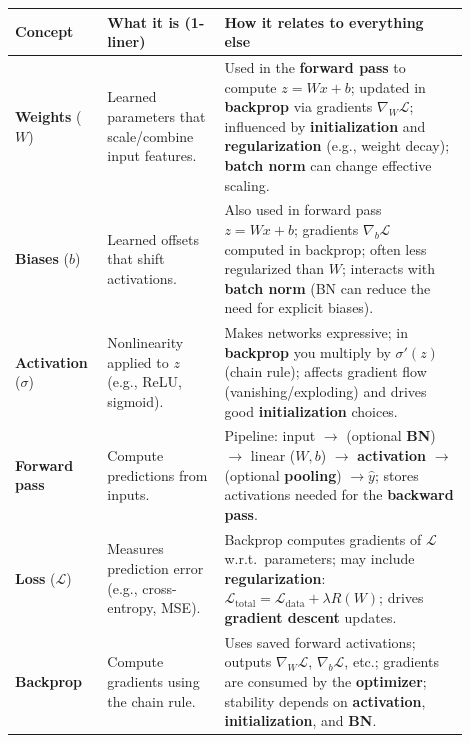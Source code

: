 \documentclass[11pt]{article}
\newcommand{\blue}[1]{\textcolor{myblue}{#1}}
\newcommand{\red}[1]{\textcolor{myred}{#1}}
\begin{document}
\renewcommand{\arraystretch}{1.2}
\setlength{\tabcolsep}{6pt}
\begin{longtable}{|p{0.16\linewidth}|p{0.24\linewidth}|p{0.50\linewidth}|}
\hline
\blue{\textbf{Concept}} & \blue{\textbf{What it is (1-liner)}} & \red{\textbf{How it relates to everything else}} \\
\hline

\textbf{Weights} ($W$) &
Learned parameters that scale/combine input features. &
Used in the \textbf{forward pass} to compute $z = Wx + b$; updated in \textbf{backprop} via gradients $\nabla_W \mathcal{L}$; influenced by \textbf{initialization} and \textbf{regularization} (e.g., weight decay); \textbf{batch norm} can change effective scaling. \\
\hline

\textbf{Biases} ($b$) &
Learned offsets that shift activations. &
Also used in forward pass $z = Wx + b$; gradients $\nabla_b \mathcal{L}$ computed in backprop; often less regularized than $W$; interacts with \textbf{batch norm} (BN can reduce the need for explicit biases). \\
\hline

\textbf{Activation} ($\sigma$) &
Nonlinearity applied to $z$ (e.g., ReLU, sigmoid). &
Makes networks expressive; in \textbf{backprop} you multiply by $\sigma'(z)$ (chain rule); affects gradient flow (vanishing/exploding) and drives good \textbf{initialization} choices. \\
\hline

\textbf{Forward pass} &
Compute predictions from inputs. &
Pipeline: input $\rightarrow$ (optional \textbf{BN}) $\rightarrow$ linear ($W,b$) $\rightarrow$ \textbf{activation} $\rightarrow$ (optional \textbf{pooling}) $\rightarrow \hat{y}$; stores activations needed for the \textbf{backward pass}. \\
\hline

\textbf{Loss} ($\mathcal{L}$) &
Measures prediction error (e.g., cross-entropy, MSE). &
Backprop computes gradients of $\mathcal{L}$ w.r.t.\ parameters; may include \textbf{regularization}: $\mathcal{L}_{\text{total}} = \mathcal{L}_{\text{data}} + \lambda R(W)$; drives \textbf{gradient descent} updates. \\
\hline

\textbf{Backprop} &
Compute gradients using the chain rule. &
Uses saved forward activations; outputs $\nabla_W\mathcal{L}$, $\nabla_b\mathcal{L}$, etc.; gradients are consumed by the \textbf{optimizer}; stability depends on \textbf{activation}, \textbf{initialization}, and \textbf{BN}. \\
\hline


\end{longtable}
\end{document}
